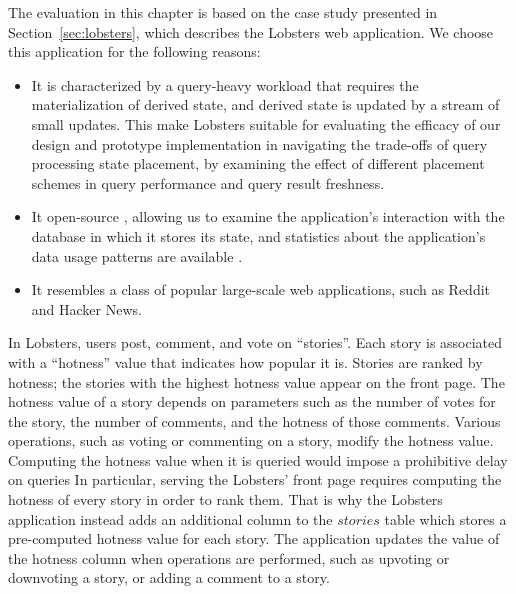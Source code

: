 The evaluation in this chapter is based on the case study presented in Section~\ref{sec:lobsters},
which describes the Lobsters \cite{lobste:rs} web application.
We choose this application for the following reasons:
\begin{itemize}
\item It is characterized by a query-heavy workload that requires the materialization of derived state,
and derived state is updated by a stream of small updates.
This make Lobsters suitable for evaluating the efficacy of our design and prototype implementation in
navigating the trade-offs of query processing state placement,
by examining the effect of different placement schemes in query performance and query result freshness.

\item It open-source \cite{lobsters:source},
allowing us to examine the application's interaction with the database in which it stores its state,
and statistics about the application's data usage patterns are available \cite{lobste:stats}.

\item It resembles a class of popular large-scale web applications, such as Reddit and Hacker News.
\end{itemize}




\bigskip
\noindent
In Lobsters, users post, comment, and vote on ``stories''.
Each story is associated with a ``hotness'' value that indicates how popular it is.
Stories are ranked by hotness;
the stories with the highest hotness value appear on the front page.
The hotness value of a story depends on parameters such as the number of votes for the story,
the number of comments, and the hotness of those comments.
Various operations, such as voting or commenting on a story, modify the hotness value.
Computing the hotness value when it is queried would impose a prohibitive delay on queries
In particular, serving the Lobsters' front page requires computing the hotness of every story in order to rank them.
That is why the Lobsters application instead adds an additional column to the $stories$ table which stores a pre-computed
hotness value for each story.
The application updates the value of the hotness column when operations are performed,
such as upvoting or downvoting a story, or adding a comment to a story.


